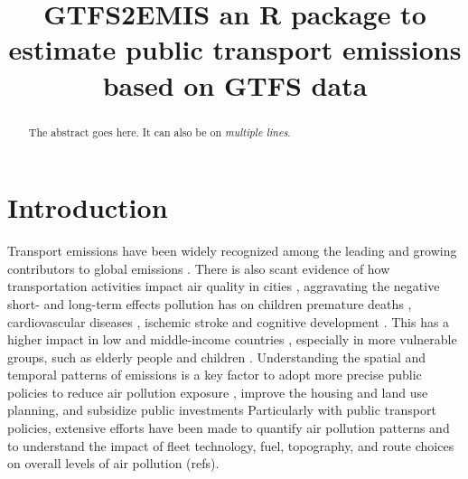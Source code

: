 \documentclass[gc, manuscript]{copernicus}
\begin{document}
\title{GTFS2EMIS an R package to estimate public transport emissions
based on GTFS data}











\received{}
\pubdiscuss{} %
\revised{}
\accepted{}
\published{}




\maketitle


\begin{abstract}
The abstract goes here. It can also be on \emph{multiple lines}.
\end{abstract}




\section{Introduction}

Transport emissions have been widely recognized among the leading and
growing contributors to global emissions \citep[
]{caiazzo_air_2013, nocera_assessing_2018}. There is also scant evidence
of how transportation activities impact air quality in cities
\citep{landrigan_lancet_2018}, aggravating the negative short- and
long-term effects pollution has on children premature deaths
\citep{currie_traffic_2009}, cardiovascular diseases
\citep{brook_particulate_2010, turner_long-term_2016}, ischemic stroke
\citep{wellenius_ambient_2012} and cognitive development
\citep{chen_living_2017, fu_association_2019, shehab_effects_2019, zhang_impact_2018}.
This has a higher impact in low and middle-income countries
\citep{combes_fine_2019}, especially in more vulnerable groups, such as
elderly people \citep{yap_particulate_2019} and children
\citep{braga_health_2001, gauderman_association_2015}. Understanding the
spatial and temporal patterns of emissions is a key factor to adopt more
precise public policies to reduce air pollution exposure
\citep{clark_national_2014, targino_spatial_2018}, improve the housing
and land use planning, and subsidize public investments Particularly
with public transport policies, extensive efforts have been made to
quantify air pollution patterns and to understand the impact of fleet
technology, fuel, topography, and route choices on overall levels of air
pollution (refs).
\end{document}
